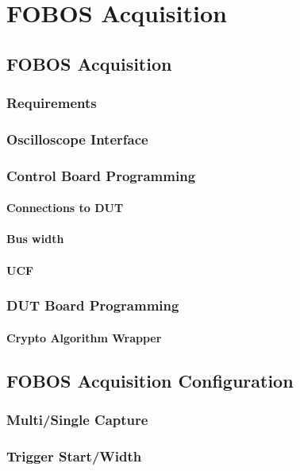 \chapter{FOBOS Acquisition}

\section{FOBOS Acquisition}
\subsection{Requirements}
\subsection{Oscilloscope Interface}
\subsection{Control Board Programming}
	\subsubsection{Connections to DUT}
	 \subsubsection{Bus width}
	 \subsubsection{UCF}

 \subsection{DUT Board Programming}
 \subsubsection{Crypto Algorithm Wrapper}

\section{FOBOS Acquisition Configuration}
\subsection{Multi/Single Capture}
\subsection{Trigger Start/Width}
